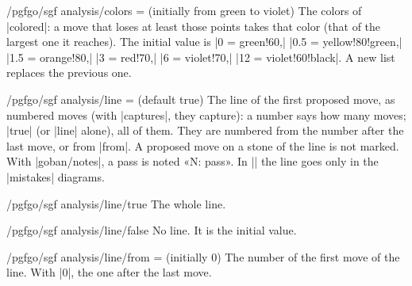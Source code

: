 \begin{key}{/pgfgo/sgf analysis/colors =  (initially from green to violet)}
	The colors of |colored|: a move that loses at least those points takes that color (that of the largest one it reaches). The initial value is |{0 = green!60,| |0.5 = yellow!80!green,| |1.5 = orange!80,| |3 = red!70,| |6 = violet!70,| |12 = violet!60!black}|. A new list replaces the previous one.

	\begin{codeexample}[]
		\begin{goban}[9, scale = 0.6]
		\end{goban}
	\end{codeexample}
\end{key}

\begin{key}{/pgfgo/sgf analysis/line =  (default true)}
	The line of the first proposed move, as numbered moves (with |captures|, they capture): a number says how many moves; |true| (or |line| alone), all of them. They are numbered from the number after the last move, or from |from|. A proposed move on a stone of the line is not marked. With |goban/notes|, a pass is noted «N: pass». In |\sgfdiagrams| the line goes only in the |mistakes| diagrams.

	\begin{codeexample}[]
		\begin{goban}[9, scale = 0.6, notes]
		\end{goban}
	\end{codeexample}
\end{key}

\begin{stylekey}{/pgfgo/sgf analysis/line/true}
	The whole line.
\end{stylekey}

\begin{stylekey}{/pgfgo/sgf analysis/line/false}
	No line. It is the initial value.
\end{stylekey}

\begin{key}{/pgfgo/sgf analysis/line/from =  (initially 0)}
	The number of the first move of the line. With |0|, the one after the last move.
\end{key}

